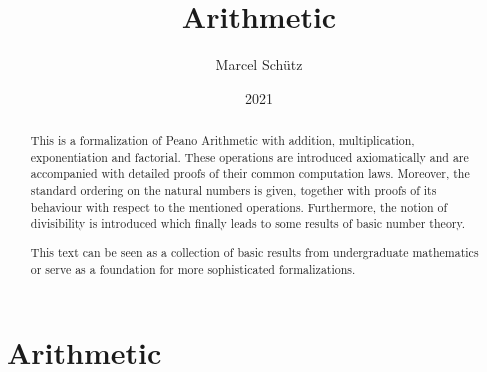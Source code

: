 \documentclass{article}
\title{Arithmetic}
\author{Marcel Schütz}
\date{2021}
\begin{document}
  \maketitle

  \begin{abstract}
    This is a formalization of Peano Arithmetic with addition, multiplication,
    exponentiation and factorial.
    These operations are introduced axiomatically and are accompanied with
    detailed proofs of their common computation laws.
    Moreover, the standard ordering on the natural numbers is given, together
    with proofs of its behaviour with respect to the mentioned operations.
    Furthermore, the notion of divisibility is introduced which finally leads
    to some results of basic number theory.
    
    This text can be seen as a collection of basic results from undergraduate
    mathematics or serve as a foundation for more sophisticated formalizations.
  \end{abstract}

  \tableofcontents

  \newpage
  \part{Arithmetic}

  
  \begin{comment}
    \begin{forthel}
      [readtex \path{arithmetic/sections/01_arithmetic/01_peano-axioms.ftl.tex}]
    \end{forthel}
  \end{comment}

  
  \begin{comment}
    \begin{forthel}
      [readtex \path{arithmetic/sections/01_arithmetic/02_addition.ftl.tex}]
    \end{forthel}
  \end{comment}

  
  \begin{comment}
    \begin{forthel}
      [readtex \path{arithmetic/sections/01_arithmetic/03_multiplication.ftl.tex}]
    \end{forthel}
  \end{comment}
\end{document}
